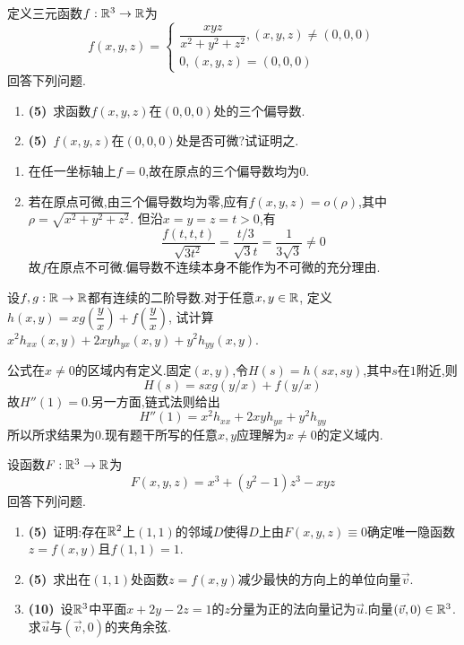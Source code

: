 \documentclass{ctexart}
\begin{document}
\begin{problem}[4.(10\songti{分})]
定义三元函数$f:\mathbb{R}^3\to\mathbb{R}$为\[f(x,y,z)=\left\{\begin{array}{l}
            \dfrac{xyz}{x^2+y^2+z^2},(x,y,z)\neq(0,0,0)\\
            0,(x,y,z)=(0,0,0)
        \end{array}\right.\]回答下列问题.
        \begin{enumerate}[label=\textbf{(\arabic*)},leftmargin=*]
            \item \textbf{(5)}\ 求函数$f(x,y,z)$在$(0,0,0)$处的三个偏导数.
            \item \textbf{(5)}\ $f(x,y,z)$在$(0,0,0)$处是否可微?试证明之.
        \end{enumerate}
\end{problem}
\begin{solution}
\begin{enumerate}[label=\tbf{(\arabic*)},leftmargin=*]
\item 在任一坐标轴上$f=0$,故在原点的三个偏导数均为$0$.
\item 若在原点可微,由三个偏导数均为零,应有$f(x,y,z)=o(\rho)$,其中$\rho=\sqrt{x^2+y^2+z^2}$.
但沿$x=y=z=t>0$,有
\[\dfrac{f(t,t,t)}{\sqrt{3t^2}}=\dfrac{t/3}{\sqrt3t}=\dfrac1{3\sqrt3}\neq0\]
故$f$在原点不可微.偏导数不连续本身不能作为不可微的充分理由.
\end{enumerate}
\end{solution}
\begin{problem}[5.(15\songti{分})]
设$f,g:\mathbb{R}\to\mathbb{R}$都有连续的二阶导数.对于任意$x,y\in\mathbb{R}$,
        定义$h(x,y)=xg\left(\dfrac{y}{x}\right)+f\left(\dfrac{y}{x}\right)$,
        试计算$x^2h_{xx}(x,y)+2xyh_{yx}(x,y)+y^2h_{yy}(x,y)$.
\end{problem}
\begin{solution}
公式在$x\neq0$的区域内有定义.固定$(x,y)$,令$H(s)=h(sx,sy)$,其中$s$在$1$附近,则
\[H(s)=sxg(y/x)+f(y/x)\]
故$H''(1)=0$.另一方面,链式法则给出
\[H''(1)=x^2h_{xx}+2xyh_{yx}+y^2h_{yy}\]
所以所求结果为$0$.现有题干所写的任意$x,y$应理解为$x\neq0$的定义域内.
\end{solution}
\begin{problem}[6.(20\songti{分})]
设函数$F:\mathbb{R}^3\to\mathbb{R}$为\[F(x,y,z)=x^3+(y^2-1)z^3-xyz\]回答下列问题.
        \begin{enumerate}[label=\textbf{(\arabic*)},leftmargin=*]
            \item \textbf{(5)}\ 证明:存在$\mathbb{R}^2$上$(1,1)$的邻域$D$使得$D$上由$F(x,y,z)\equiv0$确定唯一隐函数$z=f(x,y)$且$f(1,1)=1$.
            \item \textbf{(5)}\ 求出在$(1,1)$处函数$z=f(x,y)$减少最快的方向上的单位向量$\vec{v}$.
            \item \textbf{(10)}\ 设$\mathbb{R}^3$中平面$x+2y-2z=1$的$z$分量为正的法向量记为$\vec{u}$.向量$(\vec{v},0)\in\mathbb{R}^3$.求$\vec{u}$与$(\vec{v},0)$的夹角余弦.
        \end{enumerate}
\end{problem}
\end{document}
